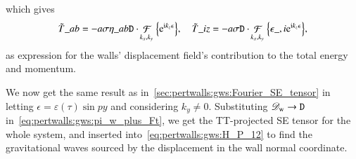     which gives 
    \begin{equation}
        \begin{split}
            \Ft{T}\_{ab} = - a\sigma \eta\_{ab} \mathtt{D} \cdot \mathop{\mathcal{F}}_{k_x,k_y}\cclosed{\eu[\im k_z \epsilon]}, \quad \Ft{T}\_{iz} = - a\sigma \mathtt{D} \cdot  \mathop{\mathcal{F}}_{k_x,k_y}\cclosed{\epsilon\_{, i} \eu[\im k_z \epsilon]} ,
        \end{split}
    \end{equation}
    as expression for the walls' displacement field's contribution to the total energy and momentum. %



    
    

    We now get the same result as in~\cref{sec:pertwalls:gws:Fourier_SE_tensor} in letting $\epsilon = \varepsilon(\tau)\sin{py}$ and considering $k_y\neq 0$. Substituting $\mathscr{D}_\mathrm{w}\to \mathtt{D}$ in~\cref{eq:pertwalls:gws:pi_w_plus_Ft}, we get the TT-projected SE tensor for the whole system, and inserted into~\cref{eq:pertwalls:gws:H_P_12} to find the gravitational waves sourced by the displacement in the wall normal coordinate.



